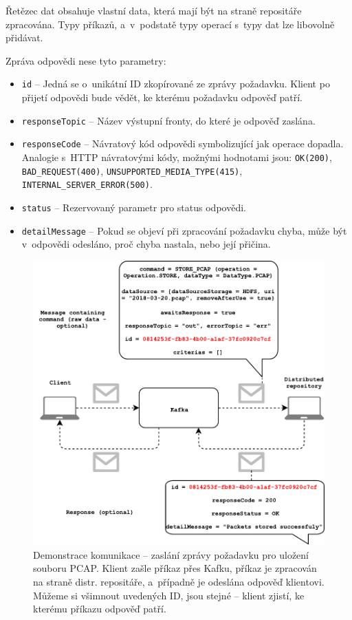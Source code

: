 \noindent Řetězec dat obsahuje vlastní data, která mají být na straně repositáře zpracována. Typy příkazů, a~v~podstatě typy operací s~typy dat lze libovolně přidávat.

\vspace{0.5cm}
\noindent Zpráva odpovědi nese tyto parametry:
\begin{itemize}
    \item \texttt{id} -- Jedná se o~unikátní ID zkopírované ze zprávy požadavku. Klient po přijetí odpovědi bude vědět, ke kterému požadavku odpověď patří.
    
    \item \texttt{responseTopic} -- Název výstupní fronty, do které je odpověď zaslána.
    
    \item \texttt{responseCode} -- Návratový kód odpovědi symbolizující jak operace dopadla. Analogie s~HTTP návratovými kódy, možnými hodnotami jsou: \texttt{OK(200)}, \texttt{BAD\_REQUEST(400)}, \texttt{UNSUPPORTED\_MEDIA\_TYPE(415)}, \texttt{INTERNAL\_SERVER\_ERROR(500)}.
    
    \item \texttt{status} -- Rezervovaný parametr pro status odpovědi.
    
    \item \texttt{detailMessage} -- Pokud se objeví při zpracování požadavku chyba, může být v~odpovědi odesláno, proč chyba nastala, nebo její přičina.
\end{itemize}

\begin{figure}[!h]
  \centering
  \includegraphics[width=14cm]{template-fig/Kafka_communication.pdf}
  \caption{Demonstrace komunikace -- zaslání zprávy požadavku pro uložení souboru PCAP. Klient zašle příkaz přes Kafku, příkaz je zpracován na straně distr. repositáře, a~případně je odeslána odpověď klientovi. Můžeme si všimnout uvedených ID, jsou stejné -- klient zjistí, ke kterému příkazu odpověď patří.}
  \label{FIG_KafkaCommunication}
\end{figure}

